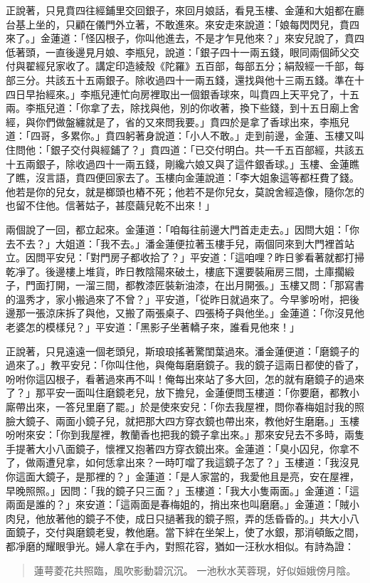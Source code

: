 正說著，只見賁四往經鋪里交回銀子，來回月娘話，看見玉樓、金蓮和大姐都在廳台基上坐的，只顧在儀門外立著，不敢進來。來安走來說道：「娘每閃閃兒，賁四來了。」金蓮道：「怪囚根子，你叫他進去，不是才乍見他來？」來安兒說了，賁四低著頭，一直後邊見月娘、李瓶兒，說道：「銀子四十一兩五錢，眼同兩個師父交付與翟經兒家收了。講定印造綾殼《陀羅》五百部，每部五分；絹殼經一千部，每部三分。共該五十五兩銀子。除收過四十一兩五錢，還找與他十三兩五錢。準在十四日早抬經來。」李瓶兒連忙向房裡取出一個銀香球來，叫賁四上天平兌了，十五兩。李瓶兒道：「你拿了去，除找與他，別的你收著，換下些錢，到十五日廟上舍經，與你們做盤纏就是了，省的又來問我要。」賁四於是拿了香球出來，李瓶兒道：「四哥，多累你。」賁四躬著身說道：「小人不敢。」走到前邊，金蓮、玉樓又叫住問他：「銀子交付與經鋪了？」賁四道：「已交付明白。共一千五百部經，共該五十五兩銀子，除收過四十一兩五錢，剛纔六娘又與了這件銀香球。」玉樓、金蓮瞧了瞧，沒言語，賁四便回家去了。玉樓向金蓮說道：「李大姐象這等都枉費了錢。他若是你的兒女，就是榔頭也樁不死；他若不是你兒女，莫說舍經造像，隨你怎的也留不住他。信著姑子，甚麼繭兒乾不出來！」

兩個說了一回，都立起來。金蓮道：「咱每往前邊大門首走走去。」因問大姐：「你去不去？」大姐道：「我不去。」潘金蓮便拉著玉樓手兒，兩個同來到大門裡首站立。因問平安兒：「對門房子都收拾了？」平安道：「這咱哩？昨日爹看著就都打掃乾凈了。後邊樓上堆貨，昨日教陰陽來破土，樓底下還要裝廂房三間，土庫擱緞子，門面打開，一溜三間，都教漆匠裝新油漆，在出月開張。」玉樓又問：「那寫書的溫秀才，家小搬過來了不曾？」平安道，「從昨日就過來了。今早爹吩咐，把後邊那一張涼床拆了與他，又搬了兩張桌子、四張椅子與他坐。」金蓮道：「你沒見他老婆怎的模樣兒？」平安道：「黑影子坐著轎子來，誰看見他來！」

正說著，只見遠遠一個老頭兒，斯琅琅搖著驚閨葉過來。潘金蓮便道：「磨鏡子的過來了。」教平安兒：「你叫住他，與俺每磨磨鏡子。我的鏡子這兩日都使的昏了，吩咐你這囚根子，看著過來再不叫！俺每出來站了多大回，怎的就有磨鏡子的過來了？」那平安一面叫住磨鏡老兒，放下擔兒，金蓮便問玉樓道：「你要磨，都教小廝帶出來，一答兒里磨了罷。」於是使來安兒：「你去我屋裡，問你春梅姐討我的照臉大鏡子、兩面小鏡子兒，就把那大四方穿衣鏡也帶出來，教他好生磨磨。」玉樓吩咐來安：「你到我屋裡，教蘭香也把我的鏡子拿出來。」那來安兒去不多時，兩隻手提著大小八面鏡子，懷裡又抱著四方穿衣鏡出來。金蓮道：「臭小囚兒，你拿不了，做兩遭兒拿，如何恁拿出來？一時叮噹了我這鏡子怎了？」玉樓道：「我沒見你這面大鏡子，是那裡的？」金蓮道：「是人家當的，我愛他且是亮，安在屋裡，早晚照照。」因問：「我的鏡子只三面？」玉樓道：「我大小隻兩面。」金蓮道：「這兩面是誰的？」來安道：「這兩面是春梅姐的，捎出來也叫磨磨。」金蓮道：「賊小肉兒，他放著他的鏡子不使，成日只撾著我的鏡子照，弄的恁昏昏的。」共大小八面鏡子，交付與磨鏡老叟，教他磨。當下絆在坐架上，使了水銀，那消頓飯之間，都凈磨的耀眼爭光。婦人拿在手內，對照花容，猶如一汪秋水相似。有詩為證：
\begin{quote}
蓮萼菱花共照臨，風吹影動碧沉沉。
一池秋水芙蓉現，好似姮娥傍月陰。
\end{quote}

